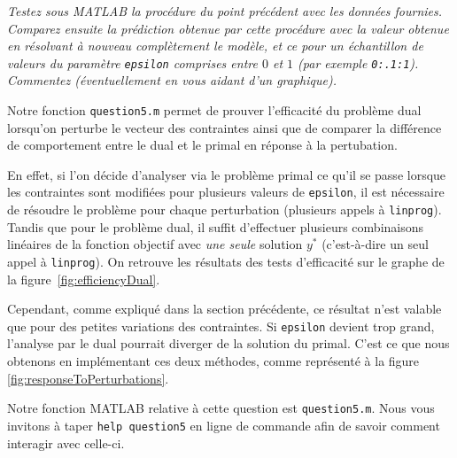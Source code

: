 \question %
\emph{Testez sous MATLAB la procédure du point précédent avec les données
fournies. Comparez ensuite la prédiction obtenue par cette procédure
avec la valeur obtenue en résolvant à nouveau complètement le modèle,
et ce pour un échantillon de valeurs du paramètre \texttt{epsilon} comprises
entre $0$ et $1$ (par exemple \texttt{0:.1:1}).
Commentez (éventuellement en vous aidant d'un graphique).}

Notre fonction \texttt{question5.m} permet de prouver l'efficacité
du problème dual lorsqu'on perturbe le vecteur des contraintes
ainsi que de comparer la différence de comportement entre le dual
et le primal en réponse à la pertubation.

En effet, si l'on décide d'analyser via le problème primal ce qu'il
se passe lorsque les contraintes sont modifiées pour plusieurs valeurs de \texttt{epsilon}, il est nécessaire de
résoudre le problème pour chaque perturbation
(plusieurs appels à \texttt{linprog}).
Tandis que pour le problème dual,
il suffit d'effectuer plusieurs combinaisons linéaires de la fonction objectif
avec \emph{une seule} solution $y^{*}$
(c'est-à-dire un seul appel à \texttt{linprog}).
On retrouve les résultats des tests d'efficacité
sur le graphe de la figure~\ref{fig:efficiencyDual}.

Cependant, comme expliqué dans la section précédente, ce résultat n'est valable que pour des petites variations des contraintes.
Si \texttt{epsilon} devient trop grand, l'analyse par le dual pourrait diverger de la solution du primal.
C'est ce que nous obtenons en implémentant ces deux méthodes, comme représenté à la figure \ref{fig:responseToPerturbations}.

Notre fonction MATLAB relative à cette question est \texttt{question5.m}. Nous vous invitons à taper \texttt{help question5} en ligne de commande afin de savoir comment interagir avec celle-ci.

